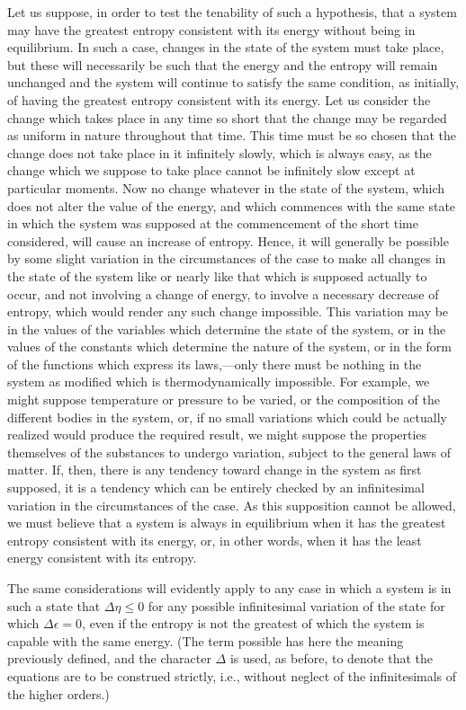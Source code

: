 \documentclass[12pt]{article}
\begin{document}
Let us suppose, in order to test the tenability of such a hypothesis, that a system may have the greatest entropy consistent with its energy without being in equilibrium. In such a case, changes in the state of the system must take place, but these will necessarily be such that the energy and the entropy will remain unchanged and the system will continue to satisfy the same condition, as initially, of having the greatest entropy consistent with its energy. Let us consider the change which takes place in any time so short that the change may be regarded as uniform in nature throughout that time. This time must be so chosen that the change does not take place in it infinitely slowly, which is always easy, as the change which we suppose to take place cannot be infinitely slow except at particular moments. Now no change whatever in the state of the system, which does not alter the value of the energy, and which commences with the same state in which the system was supposed at the commencement of the short time considered, will cause an increase of entropy. Hence, it will generally be possible by some slight variation in the circumstances of the case to make all changes in the state of the system like or nearly like that which is supposed actually to occur, and not involving a change of energy, to involve a necessary decrease of entropy, which would render any such change impossible. This variation may be in the values of the variables which determine the state of the system, or in the values of the constants which determine the nature of the system, or in the form of the functions which express its laws,---only there must be nothing in the system as modified which is thermodynamically impossible. For example, we might suppose temperature or pressure to be varied, or the composition of the different bodies in the system, or, if no small variations which could be actually realized would produce the required result, we might suppose the properties themselves of the substances to undergo variation, subject to the general laws of matter. If, then, there is any tendency toward change in the system as first supposed, it is a tendency which can be entirely checked by an infinitesimal variation in the circumstances of the case. As this supposition cannot be allowed, we must believe that a system is always in equilibrium when it has the greatest entropy consistent with its energy, or, in other words, when it has the least energy consistent with its entropy. 

The same considerations will evidently apply to any case in which a system is in such a state that $\Delta \eta \leq 0$ for any possible infinitesimal variation of the state for which $\Delta \epsilon=0$, even if the entropy is not the greatest of which the system is capable with the same energy. (The term possible has here the meaning previously defined, and the character $\Delta$ is used, as before, to denote that the equations are to be construed strictly, i.e., without neglect of the infinitesimals of the higher orders.)
\end{document}
